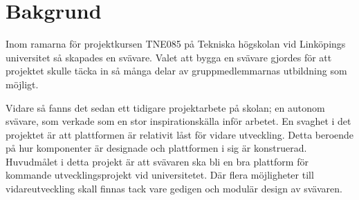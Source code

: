 \section{Bakgrund}
Inom ramarna för projektkursen TNE085 på Tekniska högskolan vid Linköpings
universitet så skapades en svävare. Valet att bygga en svävare gjordes för att
projektet skulle täcka in så många delar av gruppmedlemmarnas utbildning som
möjligt.

Vidare så fanns det sedan ett tidigare projektarbete på skolan; en autonom
svävare, som verkade som en stor inspirationskälla inför arbetet. En svaghet i
det projektet är att plattformen är relativit låst för vidare utveckling. Detta beroende på
hur komponenter är designade och plattformen i sig är konstruerad. Huvudmålet
i detta projekt är att svävaren ska bli en bra plattform för kommande
utvecklingsprojekt vid universitetet. Där flera möjligheter till
vidareutveckling skall finnas tack vare gedigen och modulär design av svävaren.
